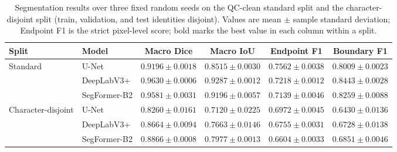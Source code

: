\begin{table}[t]
\centering
\caption{Segmentation results over three fixed random seeds on the QC-clean
standard split and the character-disjoint split (train, validation, and test
identities disjoint). Values are mean \(\pm\) sample standard deviation;
Endpoint F1 is the strict pixel-level score; bold marks the best value in
each column within a split.}
\label{tab:segmentation}
\footnotesize
\begin{tabular}{llcccc}
\toprule
Split & Model & Macro Dice & Macro IoU & Endpoint F1 & Boundary F1 \\
\midrule
\multirow{3}{*}{Standard}
  & U-Net
  & \(0.9196 \pm 0.0018\)
  & \(0.8515 \pm 0.0030\)
  & \(\mathbf{0.7562 \pm 0.0038}\)
  & \(0.8009 \pm 0.0023\) \\
  & DeepLabV3+
  & \(\mathbf{0.9630 \pm 0.0006}\)
  & \(\mathbf{0.9287 \pm 0.0012}\)
  & \(0.7218 \pm 0.0012\)
  & \(\mathbf{0.8443 \pm 0.0028}\) \\
  & SegFormer-B2
  & \(0.9581 \pm 0.0031\)
  & \(0.9196 \pm 0.0057\)
  & \(0.7139 \pm 0.0046\)
  & \(0.8259 \pm 0.0088\) \\
\midrule
\multirow{3}{*}{Character-disjoint}
  & U-Net
  & \(0.8260 \pm 0.0161\)
  & \(0.7120 \pm 0.0225\)
  & \(\mathbf{0.6972 \pm 0.0045}\)
  & \(0.6430 \pm 0.0136\) \\
  & DeepLabV3+
  & \(0.8664 \pm 0.0094\)
  & \(0.7663 \pm 0.0146\)
  & \(0.6755 \pm 0.0031\)
  & \(0.6728 \pm 0.0138\) \\
  & SegFormer-B2
  & \(\mathbf{0.8866 \pm 0.0008}\)
  & \(\mathbf{0.7977 \pm 0.0013}\)
  & \(0.6604 \pm 0.0033\)
  & \(\mathbf{0.6851 \pm 0.0046}\) \\
\bottomrule
\end{tabular}
\end{table}
